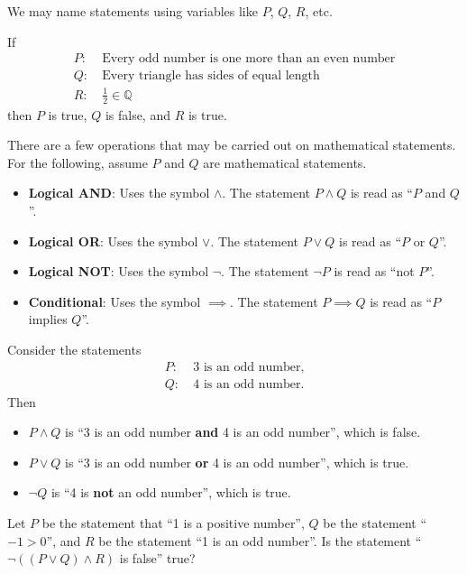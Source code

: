 We may name statements using variables like $P$, $Q$, $R$, etc.
\begin{example}
    If
    \begin{align*}
        P: &\ \text{Every odd number is one more than an even number}\\
        Q: &\ \text{Every triangle has sides of equal length}\\
        R: &\ \frac12 \in \mathbb{Q}
    \end{align*}
    then $P$ is true, $Q$ is false, and $R$ is true.
\end{example}

There are a few operations that may be carried out on mathematical statements. For the following, assume $P$ and $Q$ are mathematical statements.
\begin{itemize}
    \item \textbf{Logical AND}: Uses the symbol $\land$. The statement $P\land Q$ is read as ``$P$ and $Q$''.
    \item \textbf{Logical OR}: Uses the symbol $\lor$. The statement $P\lor Q$ is read as ``$P$ or $Q$''.
    \item \textbf{Logical NOT}: Uses the symbol $\lnot$. The statement $\lnot P$ is read as ``not $P$''.
    \item \textbf{Conditional}: Uses the symbol $\implies$. The statement $P \implies Q$ is read as ``$P$ implies $Q$''.  
\end{itemize}
\begin{example}
    Consider the statements
    \begin{align*}
        P: &\ \text{3 is an odd number,}\\
        Q: &\ \text{4 is an odd number.}
    \end{align*}
    Then
    \begin{itemize}
        \item $P\land Q$ is ``3 is an odd number \textbf{and} 4 is an odd number'', which is false.
        \item $P\lor Q$ is ``3 is an odd number \textbf{or} 4 is an odd number'', which is true.
        \item $\lnot Q$ is ``4 is \textbf{not} an odd number'', which is true.
    \end{itemize}
\end{example}
\begin{exercise}
    Let $P$ be the statement that ``1 is a positive number'', $Q$ be the statement ``$-1 > 0$'', and $R$ be the statement ``1 is an odd number''. Is the statement ``$\lnot((P\lor Q)\land R)$ is false'' true?
\end{exercise}

